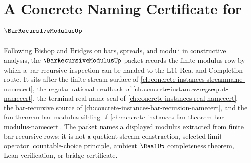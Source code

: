 \chapter{A Concrete Naming Certificate for $\BarRecursiveModulusUp$}
\label{ch:concrete-instances-bar-recursive-modulus-namecert}

Following Bishop and Bridges on bars, spreads, and moduli in constructive analysis, the $\BarRecursiveModulusUp$ packet records the finite modulus row by which a bar-recursive inspection can be handed to the L10 Real and Completion route. It sits after the finite stream surface of \autoref{ch:concrete-instances-streamname-namecert}, the regular rational readback of \autoref{ch:concrete-instances-regseqrat-namecert}, the terminal real-name seal of \autoref{ch:concrete-instances-real-namecert}, the bar-recursive source of \autoref{ch:concrete-instances-bar-recursion-namecert}, and the fan-theorem bar-modulus sibling of \autoref{ch:concrete-instances-fan-theorem-bar-modulus-namecert}. The packet names a displayed modulus extracted from finite bar-recursive rows; it is not a quotient-stream construction, selected limit operator, countable-choice principle, ambient $\RealUp$ completeness theorem, Lean verification, or bridge certificate.

